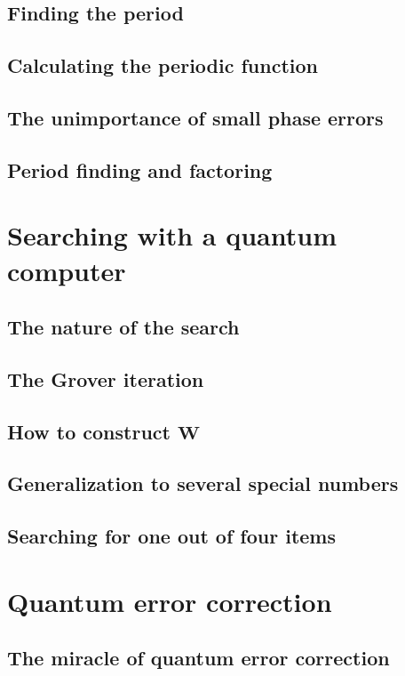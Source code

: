\documentclass{book}
\theoremstyle{definition}
\begin{document}
\subsection{Finding the period}
\subsection{Calculating the periodic function}
\subsection{The unimportance of small phase errors}
\subsection{Period finding and factoring}


\newpage

\section{Searching with a quantum computer}

\subsection{The nature of the search}
\subsection{The Grover iteration}
\subsection{How to construct $\mathbf{W}$}
\subsection{Generalization to several special numbers}
\subsection{Searching for one out of four items}


\newpage

\section{Quantum error correction}

\subsection{The miracle of quantum error correction}
\end{document}
